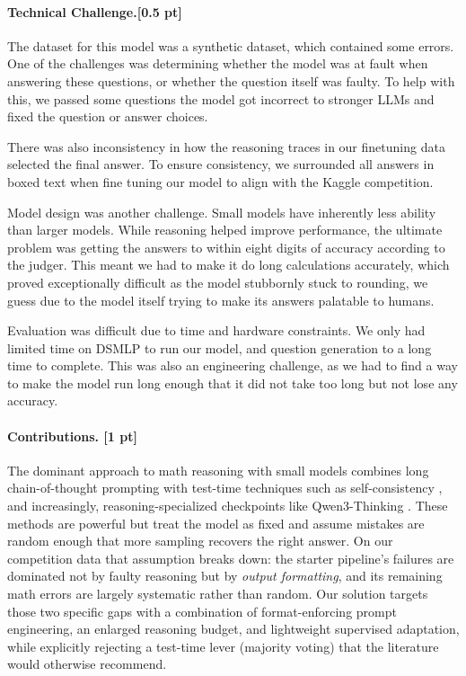 \documentclass{article}
\begin{document}
\paragraph{Technical Challenge.[0.5 pt]}
{
The dataset for this model was a synthetic dataset, which contained some errors. One of the challenges was determining whether the model was at fault when answering these questions, or whether the question itself was faulty. To help with this, we passed some questions the model got incorrect to stronger LLMs and fixed the question or answer choices. 

There was also inconsistency in how the reasoning traces in our finetuning data selected the final answer. To ensure consistency, we surrounded all answers in \\boxed{} text when fine tuning our model to align with the Kaggle competition.

Model design was another challenge. Small models have inherently less ability than larger models. While reasoning helped improve performance, the ultimate problem was getting the answers to within eight digits of accuracy according to the judger. This meant we had to make it do long calculations accurately, which proved exceptionally difficult as the model stubbornly stuck to rounding, we guess due to the model itself trying to make its answers palatable to humans.

Evaluation was difficult due to time and hardware constraints. We only had limited time on DSMLP to run our model, and question generation to a long time to complete. This was also an engineering challenge, as we had to find a way to make the model run long enough that it did not take too long but not lose any accuracy.
\paragraph{Contributions. [1 pt]}
The dominant approach to math reasoning with small models combines long chain-of-thought
prompting \citep{wei2022chain} with test-time techniques such as self-consistency
\citep{wang2022selfconsistency}, and increasingly, reasoning-specialized checkpoints like
Qwen3-Thinking \citep{qwen3}. These methods are powerful but treat the model as fixed and assume
mistakes are random enough that more sampling recovers the right answer. On our competition data
that assumption breaks down: the starter pipeline's failures are dominated not by faulty reasoning
but by \emph{output formatting}, and its remaining math errors are largely systematic rather than
random. Our solution targets those two specific gaps with a combination of format-enforcing prompt
engineering, an enlarged reasoning budget, and lightweight supervised adaptation, while explicitly
rejecting a test-time lever (majority voting) that the literature would otherwise recommend.

}
\end{document}
